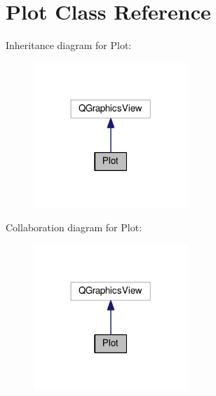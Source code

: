\hypertarget{classPlot}{}\section{Plot Class Reference}
\label{classPlot}


Inheritance diagram for Plot\+:
\nopagebreak
\begin{figure}[H]
\begin{center}
\leavevmode
\includegraphics[width=165pt]{classPlot__inherit__graph}
\end{center}
\end{figure}


Collaboration diagram for Plot\+:
\nopagebreak
\begin{figure}[H]
\begin{center}
\leavevmode
\includegraphics[width=165pt]{classPlot__coll__graph}
\end{center}
\end{figure}
